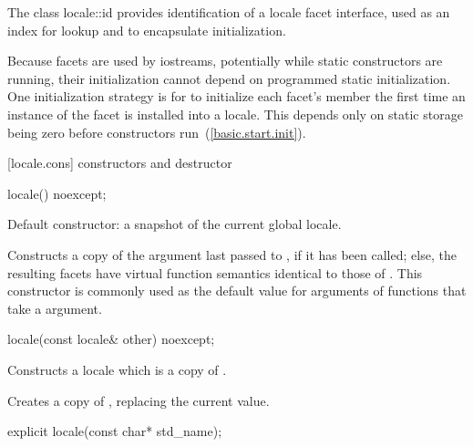 \pnum
The class locale::id provides identification of a locale facet
interface, used as an index for lookup
and to encapsulate initialization.

\pnum
\enternote
Because facets are used by iostreams, potentially while static constructors are
running, their initialization cannot depend on programmed static
initialization.
One initialization strategy is for
to initialize each facet's
member the first time an instance of the facet is installed into a locale.
This depends only on static storage being zero before constructors run~(\ref{basic.start.init}).
\exitnote

[locale.cons]{ constructors and destructor}

%
\begin{itemdecl}
locale() noexcept;
\end{itemdecl}

\begin{itemdescr}
\pnum
Default constructor: a snapshot of the current global locale.

\pnum
\effects
Constructs a copy of the argument last passed to
,
if it has been called; else, the resulting facets have virtual
function semantics identical to those of
.
\enternote
This constructor is commonly used as the default value for arguments
of functions that take a
argument.
\exitnote
\end{itemdescr}

%
\begin{itemdecl}
locale(const locale& other) noexcept;
\end{itemdecl}

\begin{itemdescr}
\pnum
\effects
Constructs a locale which is a copy of .
\end{itemdescr}

\begin{itemdescr}
\pnum
\effects
Creates a copy of , replacing the current value.

\pnum
\returns
{}
\end{itemdescr}

%
\begin{itemdecl}
explicit locale(const char* std_name);
\end{itemdecl}

